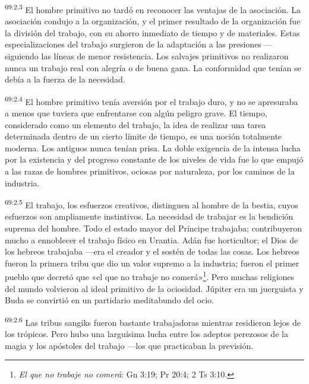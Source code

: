 \par
\textsuperscript{69:2.3} El hombre primitivo no tardó en reconocer las ventajas de la asociación. La asociación condujo a la organización, y el primer resultado de la organización fue la división del trabajo, con su ahorro inmediato de tiempo y de materiales. Estas especializaciones del trabajo surgieron de la adaptación a las presiones ---siguiendo las líneas de menor resistencia. Los salvajes primitivos no realizaron nunca un trabajo real con alegría o de buena gana. La conformidad que tenían se debía a la fuerza de la necesidad.

\par
\textsuperscript{69:2.4} El hombre primitivo tenía aversión por el trabajo duro, y no se apresuraba a menos que tuviera que enfrentarse con algún peligro grave. El tiempo, considerado como un elemento del trabajo, la idea de realizar una tarea determinada dentro de un cierto límite de tiempo, es una noción totalmente moderna. Los antiguos nunca tenían prisa. La doble exigencia de la intensa lucha por la existencia y del progreso constante de los niveles de vida fue lo que empujó a las razas de hombres primitivos, ociosas por naturaleza, por los caminos de la industria.

\par
\textsuperscript{69:2.5} El trabajo, los esfuerzos creativos, distinguen al hombre de la bestia, cuyos esfuerzos son ampliamente instintivos. La necesidad de trabajar es la bendición suprema del hombre. Todo el estado mayor del Príncipe trabajaba; contribuyeron mucho a ennoblecer el trabajo físico en Urantia. Adán fue horticultor; el Dios de los hebreos trabajaba ---era el creador y el sostén de todas las cosas. Los hebreos fueron la primera tribu que dio un valor supremo a la industria; fueron el primer pueblo que decretó que «el que no trabaje no comerá»\footnote{\textit{El que no trabaje no comerá}: Gn 3:19; Pr 20:4; 2 Ts 3:10.}. Pero muchas religiones del mundo volvieron al ideal primitivo de la ociosidad. Júpiter era un juerguista y Buda se convirtió en un partidario meditabundo del ocio.

\par
\textsuperscript{69:2.6} Las tribus sangiks fueron bastante trabajadoras mientras residieron lejos de los trópicos. Pero hubo una larguísima lucha entre los adeptos perezosos de la magia y los apóstoles del trabajo ---los que practicaban la previsión.

